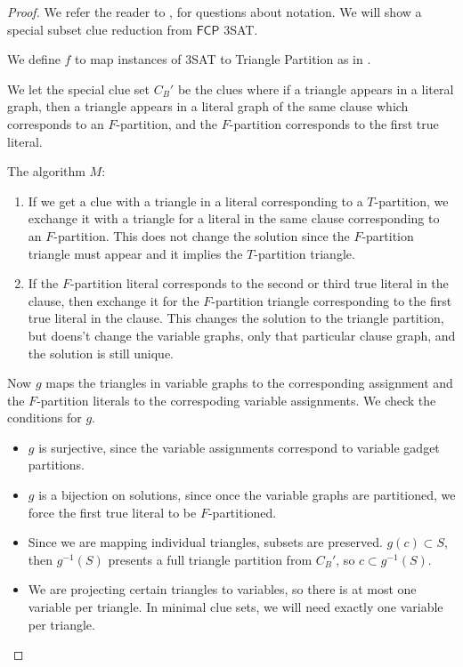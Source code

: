 \documentclass[runningheads,a4paper]{llncs}
\begin{document}
\begin{proof}
We refer the reader to \cite{holyer1981np}, \cite{colbourn1984complexity} for questions about notation. We will show a special subset clue reduction from $\mathsf{FCP}$ 3SAT. 

We define $f$ to map instances of 3SAT to Triangle Partition as in \cite{holyer1981np}.

We let the special clue set $C_B'$ be the clues where if a triangle appears in a literal graph, then a triangle appears in a literal graph of the same clause which corresponds to an $F$-partition, and the $F$-partition corresponds to the first true literal.

The algorithm $M$: 
\begin{enumerate}
\item If we get a clue with a triangle in a literal corresponding to a $T$-partition, we exchange it with a triangle for a literal in the same clause corresponding to an $F$-partition. This does not change the solution since the $F$-partition triangle must appear and it implies the $T$-partition triangle. 
\item If the $F$-partition literal corresponds to the second or third true literal in the clause, then exchange it for the $F$-partition triangle corresponding to the first true literal in the clause. This changes the solution to the triangle partition, but doens't change the variable graphs, only that particular clause graph, and the solution is still unique.
\end{enumerate}

Now $g$ maps the triangles in variable graphs to the corresponding assignment and the $F$-partition literals to the correspoding variable assignments. We check the conditions for $g$.
\begin{itemize}
\item $g$ is surjective, since the variable assignments correspond to variable gadget partitions.
\item $g$ is a bijection on solutions, since once the variable graphs are partitioned, we force the first true literal to be $F$-partitioned. 
\item Since we are mapping individual triangles, subsets are preserved. $g(c) \subset S$, then $g^{-1}(S)$ presents a full triangle partition from $C_B'$, so $c \subset g^{-1}(S)$. 
\item We are projecting certain triangles to variables, so there is at most one variable per triangle. In minimal clue sets, we will need exactly one variable per triangle.
\end{itemize}
\end{proof}
\end{document}
